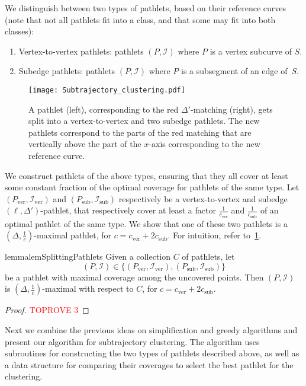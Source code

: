 \documentclass[a4paper,UKenglish,cleveref,thm-restate,notab]{lipics-v2021}
\newcommand{\I}{\mathcal{I}}
\newcommand{\ver}{\mathrm{ver}}
\newcommand{\sub}{\mathrm{sub}}
\begin{document}
    We distinguish between two types of pathlets, based on their reference curves (note that not all pathlets fit into a class, and that some may fit into both classes):
    \begin{enumerate}
        \item Vertex-to-vertex pathlets: pathlets $(P, \I)$ where $P$ is a vertex subcurve of $S$.
        \item Subedge pathlets: pathlets $(P, \I)$ where $P$ is a subsegment of an edge of~$S$.
    \end{enumerate}

    \begin{figure}
        \centering
        \texttt{[image: Subtrajectory\_clustering.pdf]}
        \caption{A pathlet (left), corresponding to the red $\Delta'$-matching (right), gets split into a vertex-to-vertex and two subedge pathlets.
        The new pathlets correspond to the parts of the red matching that are vertically above the part of the $x$-axis corresponding to the new reference curve.
        }
        \label{fig:splitting_pathlets}
    \end{figure}

\noindent
    We construct pathlets of the above types, ensuring that they all cover at least some constant fraction of the optimal coverage for pathlets of the same type.
    Let $(P_\ver, \I_\ver)$ and $(P_\sub, \I_\sub)$ respectively be a vertex-to-vertex and subedge $(\ell, \Delta')$-pathlet, that respectively cover at least a factor $\frac{1}{c_\ver}$ and $\frac{1}{c_\sub}$ of an optimal pathlet of the same type.
    We show that one of these two pathlets is a $(\Delta, \frac{1}{c})$-maximal pathlet, for $c = c_\ver + 2c_\sub$.
    For intuition, refer to~\cref{fig:splitting_pathlets}.

    \begin{restatable}{lemma}{lemSplittingPathlets}
    \label{lem:quality_of_pathlet}
        Given a collection $C$ of pathlets, let
        \[
            (P, \I) \in \{(P_\ver, \I_\ver), (P_\sub, \I_\sub)\}
        \]
        be a pathlet with maximal coverage among the uncovered points.
        Then $(P, \I)$ is $(\Delta, \frac{1}{c})$-maximal with respect to $C$, for $c = c_\ver + 2c_\sub$.
    \end{restatable}

    \begin{proof}\textcolor{red}{TOPROVE 3}\end{proof}


    Next we combine the previous ideas on simplification and greedy algorithms and present our algorithm for subtrajectory clustering.
    The algorithm uses subroutines for constructing the two types of pathlets described above, as well as a data structure for comparing their coverages to select the best pathlet for the clustering.
    
\end{document}
